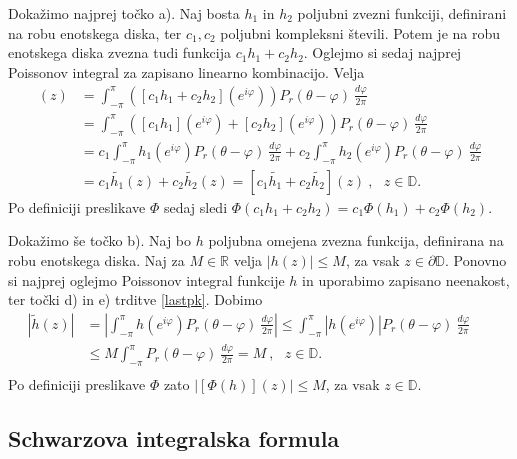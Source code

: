\documentclass[mat1, tisk]{fmfdelo}
\begin{document}
    \begin{dokaz}
           Dokažimo najprej točko a). Naj bosta $h_1$ in $h_2$ poljubni zvezni funkciji, definirani na robu enotskega diska, ter $c_1, c_2$ poljubni kompleksni števili. 
           Potem je na robu enotskega diska zvezna tudi funkcija $c_1 h_1 + c_2 h_2$. Oglejmo si sedaj najprej Poissonov integral za zapisano linearno kombinacijo. Velja
           \begin{align*}
               [\widetilde{c_1 h_1 + c_2 h_2}](z) &= \int_{-\pi}^{\pi}{\left([c_1 h_1 + c_2 h_2](e^{i\varphi}) \right)P_r(\theta - \varphi)~\frac{d\varphi}{2 \pi}}\\ 
               & = \int_{-\pi}^{\pi}{\left([c_1 h_1](e^{i\varphi}) + [c_2 h_2](e^{i\varphi})\right)P_r(\theta - \varphi)~\frac{d\varphi}{2 \pi}}\\
               & = c_1\int_{-\pi}^{\pi}{h_1(e^{i\varphi})P_r(\theta - \varphi)~\frac{d\varphi}{2 \pi}} + c_2\int_{-\pi}^{\pi}{h_2(e^{i\varphi})P_r(\theta - \varphi)~\frac{d\varphi}{2 \pi}}\\
               & = c_1 \widetilde{h_1}(z) + c_2 \widetilde{h_2}(z) = [c_1 \widetilde{h_1} + c_2 \widetilde{h_2}](z)~,~~~z \in \mathbb{D}.
           \end{align*}
           Po definiciji preslikave $\Phi$ sedaj sledi $\Phi(c_1 h_1 + c_2 h_2) = c_1 \Phi(h_1) + c_2 \Phi(h_2)$.
           
           Dokažimo še točko b). Naj bo $h$ poljubna omejena zvezna funkcija, definirana na robu enotskega diska. Naj za $M \in \mathbb{R}$ velja $|h(z)| \leq M$, za vsak $z \in \partial \mathbb{D}$.
           Ponovno si najprej oglejmo Poissonov integral funkcije $h$ in uporabimo zapisano neenakost, ter točki d) in e) trditve \ref{lastpk}. Dobimo
           \begin{align*}
               \left|\widetilde{h}(z)\right| &= \left| \int_{-\pi}^{\pi}{h(e^{i\varphi}) P_r(\theta - \varphi)~\frac{d\varphi}{2 \pi}} \right| \leq \int_{-\pi}^{\pi}{\left|h(e^{i\varphi}) \right|P_r(\theta - \varphi)~\frac{d\varphi}{2 \pi}} \\ 
               &\leq M \int_{-\pi}^{\pi}{P_r(\theta - \varphi)~\frac{d\varphi}{2 \pi}} = M~,~~~z \in \mathbb{D}.& & \\
           \end{align*}
           Po definiciji preslikave $\Phi$ zato $|[\Phi(h)](z)| \leq M$, za vsak $z \in \mathbb{D}$.
    \end{dokaz}

\subsection{Schwarzova integralska formula}
\end{document}

